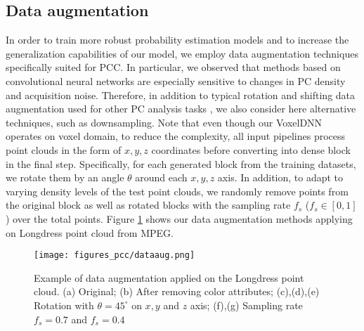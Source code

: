 \subsection{Data augmentation} 
In order to train more robust probability estimation models and to increase the generalization capabilities of our model, we employ data augmentation techniques specifically suited for PCC.
In particular, we observed that methods based on convolutional neural networks are especially sensitive to changes in PC density and acquisition noise. Therefore, in addition to typical rotation and shifting data augmentation used for other PC analysis tasks \cite{alonso20203dmininet, wang2020multiscale}, we also consider here alternative techniques, such as downsampling. Note that even though our VoxelDNN operates on voxel domain, to reduce the complexity, all input pipelines process point clouds in the form of $x,y,z$ coordinates before converting into dense block in the final step.
Specifically, for each generated block from the training datasets, we rotate them by an angle $\theta$ around each $x,y,z$ axis. In addition, to adapt to varying density levels of the test point clouds, we randomly remove points from the original block as well as rotated blocks with the sampling rate $f_{s}$ ($f_s \in \left[ 0, 1\right]$) over the total points. Figure \ref{fig:dataaugment} shows our data augmentation methods applying on Longdress point cloud from MPEG. \\
\begin{figure}[tb]
\captionsetup{justification=raggedright}
\centering
\texttt{[image: figures\_pcc/dataaug.png]}
\caption{Example of data augmentation applied on the Longdress point cloud. (a) Original; (b) After removing color attributes; (c),(d),(e) Rotation with $\theta=45^{\circ}$ on $x,y$ and $z$ axis; (f),(g) Sampling rate  $f_{s}=0.7$ and $f_{s}=0.4$ }
\label{fig:dataaugment}
\end{figure}